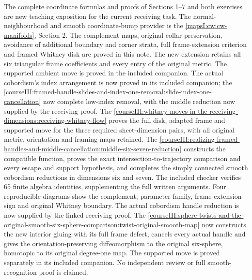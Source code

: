The complete coordinate formulas and proofs of Sections 1--7 and both exercises are new teaching exposition for the current receiving task. The normal-neighbourhood and smooth coordinate-bump provider is the \cref{mapsI:cw:cw-manifolds}, Section 2. The complement maps, original collar preservation, avoidance of additional boundary and corner strata, full frame-extension criterion and framed Whitney disk are proved in this note. The new extension retains all six triangular frame coefficients and every entry of the original metric. The supported ambient move is proved in the included companion. The actual cobordism's index arrangement is now proved in its included companion; the \cref{courseIII:framed-handle-slides-and-index-one-removal:slide-index-one-cancellation} now complete low-index removal, with the middle reduction now supplied by the receiving proof. The \cref{courseIII:whitney-moves-in-the-receiving-dimensions:receiving-whitney-flow} proves the full disk, adapted frame and supported move for the three required sheet-dimension pairs, with all original metric, orientation and framing maps retained. The \cref{courseIII:realizing-framed-handles-and-middle-cancellation:middle-six-seven-reduction} constructs the compatible function, proves the exact intersection-to-trajectory comparison and every escape and support hypothesis, and completes the simply connected smooth cobordism reductions in dimensions six and seven. The included checker verifies 65 finite algebra identities, supplementing the full written arguments. Four reproducible diagrams show the complement, parameter family, frame-extension sign and original Whitney boundary. The actual cobordism handle reduction is now supplied by the linked receiving proof. The \cref{courseIII:sphere-twists-and-the-original-smooth-six-sphere-comparison:twist-original-smooth-map} now constructs the new interior gluing with its full frame defect, cancels every actual handle and gives the orientation-preserving diffeomorphism to the original six-sphere, homotopic to its original degree-one map. The supported move is proved separately in its included companion. No independent review or full smooth-recognition proof is claimed.

